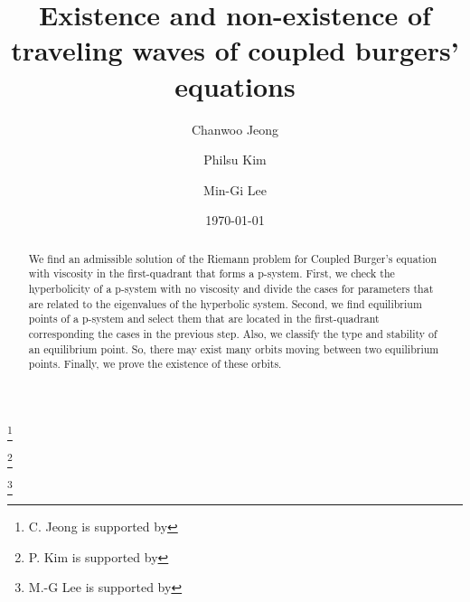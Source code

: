 \documentclass{amsart}
\def\blue{\color{blue}}
\theoremstyle{definition}
\numberwithin{equation}{section}
\begin{document}
\title{Existence and non-existence of traveling waves of coupled burgers' equations}

\author{Chanwoo Jeong}
\address{Department of Mathematics, Kyungpook National University, Daegu, South Korea}
\thanks{C. Jeong is supported by }

\author{Philsu Kim}
\address{Department of Mathematics, Kyungpook National University, Daegu, South Korea}
\thanks{P. Kim is supported by }

\author{Min-Gi Lee}
\address{Department of Mathematics, Kyungpook National University, Daegu, South Korea}
\thanks{M.-G Lee is supported by }


\date{\today}




\date{}


\maketitle
\begin{abstract}
{\blue
 We find an admissible solution of the Riemann problem for Coupled Burger's equation with viscosity in the first-quadrant that forms a p-system. First, we check the hyperbolicity of a p-system with no viscosity and divide the cases for parameters that are related to the eigenvalues of the hyperbolic system. Second, we find equilibrium points of a p-system and 
select them that are located in the first-quadrant corresponding the cases in the previous step. Also, we classify the type and stability of an equilibrium point. So, there may exist many orbits moving between two equilibrium points. Finally, we prove the existence of these orbits.}
\end{abstract}
\end{document}
